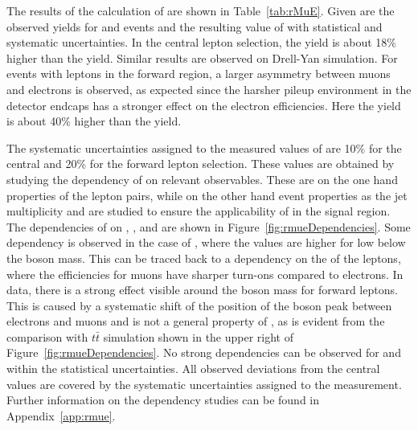 The results of the calculation of \rmue are shown in Table~\ref{tab:rMuE}. Given are the observed yields for \MM and \EE events and the resulting value of \rmue with statistical and systematic uncertainties. In the central lepton selection, the \MM yield is about 18\% higher than the \EE yield. Similar results are observed on Drell-Yan simulation. For events with leptons in the forward region, a larger asymmetry between muons and electrons is observed, as expected since the harsher pileup environment in the detector endcaps has a stronger effect on the electron efficiencies. Here the \MM yield is about 40\% higher than the \EE yield. 

The systematic uncertainties assigned to the measured values of \rmue are 10\% for the central and 20\% for the forward lepton selection. These values are obtained by studying the dependency of \rmue on relevant observables. These are on the one hand properties of the lepton pairs, while on the other hand event properties as the jet multiplicity and \MET are studied to ensure the applicability of \rmue in the signal region. The dependencies of \rmue on \mll, \MET, and \njets are shown in Figure~\ref{fig:rmueDependencies}. Some dependency is observed in the case of \mll, where the values are higher for low \mll below the \Z boson mass. This can be traced back to a dependency on the \pt of the leptons, where the efficiencies for muons have sharper turn-ons compared to electrons. In data, there is a strong effect visible around the \Z boson mass for forward leptons. This is caused by a systematic shift of the position of the \Z boson peak between electrons and muons and is not a general property of \rmue, as is evident from the comparison with $t\bar{t}$ simulation shown in the upper right of Figure~\ref{fig:rmueDependencies}. No strong dependencies can be observed for \MET and \njets within the statistical uncertainties. All observed deviations from the central values are covered by the systematic uncertainties assigned to the measurement. Further information on the dependency studies can be found in Appendix~\ref{app:rmue}.
